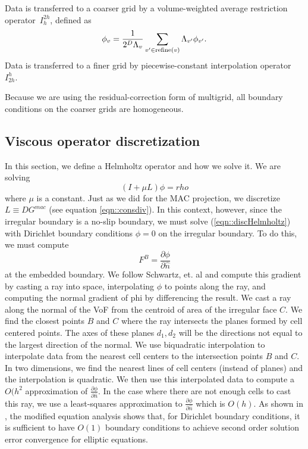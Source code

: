 Data is transferred to a coarser grid by a volume-weighted average
restriction operator~$I^{2h}_h$, defined as
\begin{equation}
\phi_v = \frac{1}{2^D \Lambda_v} 
\sum_{v'\in\mbox{\scriptsize refine}(v)} \Lambda_{v'} \phi_{v'}
.
\end{equation}
Data is transferred to a finer grid by piecewise-constant
interpolation operator~$I^h_{2h}$.

Because we are using the residual-correction form of multigrid, all
boundary conditions on the coarser grids are homogeneous.



\subsection{Viscous operator discretization}
\label{sec::viscOp}


In this section, we define a Helmholtz operator and how we solve
it.   We are  solving 
\begin{equation}
(I + \mu L) \phi = rho
\label{eqn::discHelmholtz}
\end{equation}
where $\mu$ is a constant.
Just as we did for the MAC projection, we discretize  
$L \equiv D G^{mac}$ (see equation \ref{eqn::consdiv}).
In this context, however, since the irregular
boundary is a no-slip boundary, we must solve
(\ref{eqn::discHelmholtz}) with Dirichlet boundary conditions
 $\phi =0$
 on the irregular boundary.  To do this, we must compute 
$$
F^{B} =  \frac{\partial \phi}{\partial \hat{n}}
$$
at the embedded boundary.   We follow Schwartz, et. al
\cite{SBCL:2005}  and compute this gradient by casting a
ray into space, interpolating $\phi$ to points along the ray, and
computing the normal gradient of phi by differencing the result.
We cast a ray along
the normal of the VoF from  the  centroid of area of the irregular
face $C$.    We find the closest points $B$ and $C$ where the ray intersects
the planes formed by cell centered points.   The axes of these planes
$d_1, d_2$ will be the directions not equal to the largest direction
of the normal.    We use biquadratic interpolation
to interpolate data from the nearest cell
centers to the intersection points $B$ and $C$.  In two dimensions, we
find the nearest lines of cell centers (instead of planes) and the
interpolation is quadratic. We then use this
interpolated data to compute a $O(h^2$ approximation of
$\frac{\partial \phi}{\partial \hat{n}}$.   In the case  where there
are not enough cells to cast this ray, we use a least-squares
approximation to $\frac{\partial \phi}{\partial \hat{n}}$ which is
$O(h)$.  As shown in \cite{johansenColella:1998}, the modified
equation analysis shows that, for Dirichlet boundary conditions, it is
sufficient to have $O(1)$ boundary conditions to achieve second order
solution error convergence for elliptic equations.

